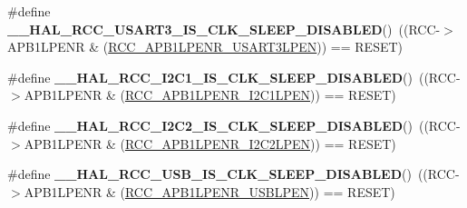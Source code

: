\begin{DoxyCompactItemize}
\item 
\hypertarget{group___r_c_c___a_p_b1___clock___sleep___enable___disable___status_gad5c5c2cf7612ea68ae679de26f0bc26e}{\#define {\bfseries \-\_\-\-\_\-\-H\-A\-L\-\_\-\-R\-C\-C\-\_\-\-U\-S\-A\-R\-T3\-\_\-\-I\-S\-\_\-\-C\-L\-K\-\_\-\-S\-L\-E\-E\-P\-\_\-\-D\-I\-S\-A\-B\-L\-E\-D}()~((R\-C\-C-\/$>$A\-P\-B1\-L\-P\-E\-N\-R \& (\hyperlink{group___peripheral___registers___bits___definition_gae11baa29f4e6d122dabdd54c6b4be052}{R\-C\-C\-\_\-\-A\-P\-B1\-L\-P\-E\-N\-R\-\_\-\-U\-S\-A\-R\-T3\-L\-P\-E\-N})) == R\-E\-S\-E\-T)}\label{group___r_c_c___a_p_b1___clock___sleep___enable___disable___status_gad5c5c2cf7612ea68ae679de26f0bc26e}

\item 
\hypertarget{group___r_c_c___a_p_b1___clock___sleep___enable___disable___status_ga133208873edc0be1774bf4f3c224a2ac}{\#define {\bfseries \-\_\-\-\_\-\-H\-A\-L\-\_\-\-R\-C\-C\-\_\-\-I2\-C1\-\_\-\-I\-S\-\_\-\-C\-L\-K\-\_\-\-S\-L\-E\-E\-P\-\_\-\-D\-I\-S\-A\-B\-L\-E\-D}()~((R\-C\-C-\/$>$A\-P\-B1\-L\-P\-E\-N\-R \& (\hyperlink{group___peripheral___registers___bits___definition_ga33286469d0a9b9fedbc2b60aa6cd7da7}{R\-C\-C\-\_\-\-A\-P\-B1\-L\-P\-E\-N\-R\-\_\-\-I2\-C1\-L\-P\-E\-N})) == R\-E\-S\-E\-T)}\label{group___r_c_c___a_p_b1___clock___sleep___enable___disable___status_ga133208873edc0be1774bf4f3c224a2ac}

\item 
\hypertarget{group___r_c_c___a_p_b1___clock___sleep___enable___disable___status_ga901cecc03cce495d9f01a7228a3bce1c}{\#define {\bfseries \-\_\-\-\_\-\-H\-A\-L\-\_\-\-R\-C\-C\-\_\-\-I2\-C2\-\_\-\-I\-S\-\_\-\-C\-L\-K\-\_\-\-S\-L\-E\-E\-P\-\_\-\-D\-I\-S\-A\-B\-L\-E\-D}()~((R\-C\-C-\/$>$A\-P\-B1\-L\-P\-E\-N\-R \& (\hyperlink{group___peripheral___registers___bits___definition_gaf6a53d37df11a56412ae06f73626f637}{R\-C\-C\-\_\-\-A\-P\-B1\-L\-P\-E\-N\-R\-\_\-\-I2\-C2\-L\-P\-E\-N})) == R\-E\-S\-E\-T)}\label{group___r_c_c___a_p_b1___clock___sleep___enable___disable___status_ga901cecc03cce495d9f01a7228a3bce1c}

\item 
\hypertarget{group___r_c_c___a_p_b1___clock___sleep___enable___disable___status_gab9ea1fbdc9d23388137d087f37a42390}{\#define {\bfseries \-\_\-\-\_\-\-H\-A\-L\-\_\-\-R\-C\-C\-\_\-\-U\-S\-B\-\_\-\-I\-S\-\_\-\-C\-L\-K\-\_\-\-S\-L\-E\-E\-P\-\_\-\-D\-I\-S\-A\-B\-L\-E\-D}()~((R\-C\-C-\/$>$A\-P\-B1\-L\-P\-E\-N\-R \& (\hyperlink{group___peripheral___registers___bits___definition_ga9c068ba6f9554c5b98ddc7c87b658e1e}{R\-C\-C\-\_\-\-A\-P\-B1\-L\-P\-E\-N\-R\-\_\-\-U\-S\-B\-L\-P\-E\-N})) == R\-E\-S\-E\-T)}\label{group___r_c_c___a_p_b1___clock___sleep___enable___disable___status_gab9ea1fbdc9d23388137d087f37a42390}


\end{DoxyCompactItemize}

